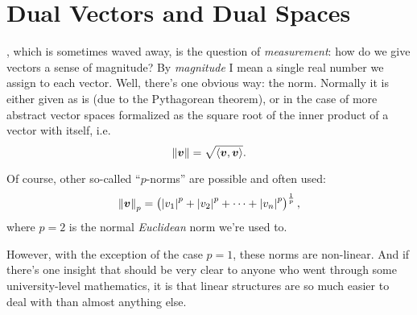 \section{Dual Vectors and Dual Spaces}


, which is sometimes waved away, is the question of \textit{measurement}: how do we give vectors a sense of magnitude? By \textit{magnitude} I mean a single real number we assign to each vector. Well, there's one obvious way: the norm. Normally it is either given as is (due to the Pythagorean theorem), or in the case of more abstract vector spaces formalized as the square root of the inner product of a vector with itself, i.e.
\begin{equation}
    \left\| \bm{v} \right\| = \sqrt{\langle \bm{v},\bm{v} \rangle}.
    \label{eq:vector_norm}
\end{equation}

Of course, other so-called \enquote{$p$-norms} are possible and often used:
\begin{equation}
    \norm{\bm{v}}_{p} = \left(\abs{v_{1}}^{p}+\abs{v_{2}}^{p} + \dots + \abs{v_{n}}^{p}\right)^{\frac{1}{p}},
    \label{eq:label}
\end{equation}
where $p=2$ is the normal \textit{Euclidean} norm we're used to.

However, with the exception of the case $p=1$, these norms are non-linear. And if there's one insight that should be very clear to anyone who went through some university-level mathematics, it is that linear structures are so much easier to deal with than almost anything else.

